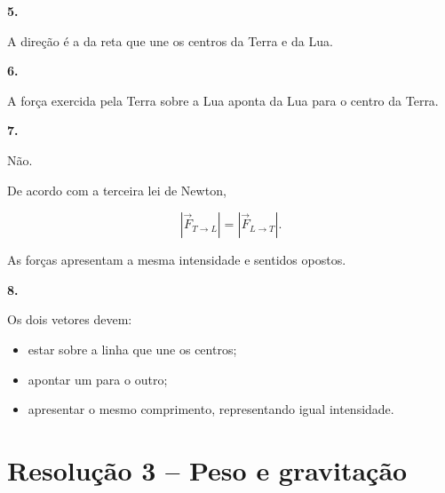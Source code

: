 \documentclass[11pt,a4paper]{article}
\begin{document}
	\begin{solucaobox}[Questões 5--8]
		
		\textbf{5.}
		
		A direção é a da reta que une os centros da Terra e da Lua.
		
		\vspace{2mm}
		
		\textbf{6.}
		
		A força exercida pela Terra sobre a Lua aponta da Lua para o centro da
		Terra.
		
		\vspace{2mm}
		
		\textbf{7.}
		
		Não.
		
		De acordo com a terceira lei de Newton,
		
		\[
		\left|
		\vec F_{T\rightarrow L}
		\right|
		=
		\left|
		\vec F_{L\rightarrow T}
		\right|.
		\]
		
		As forças apresentam a mesma intensidade e sentidos opostos.
		
		\vspace{2mm}
		
		\textbf{8.}
		
		Os dois vetores devem:
		
		\begin{itemize}
			
			\item estar sobre a linha que une os centros;
			
			\item apontar um para o outro;
			
			\item apresentar o mesmo comprimento, representando igual intensidade.
			
		\end{itemize}
		
	\end{solucaobox}
	
	\section*{Resolução 3 -- Peso e gravitação}
	
\end{document}
